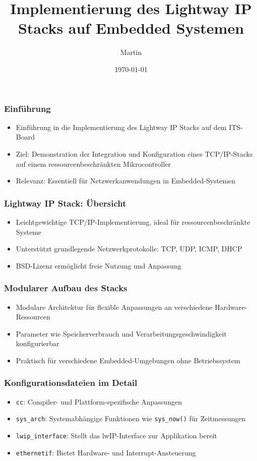 \documentclass{beamer}
\title{Implementierung des Lightway IP Stacks auf Embedded Systemen}
\author{Martin}
\date{\today}
\begin{document}
\frame{\titlepage}

\begin{frame}
\frametitle{Einführung}
\begin{itemize}
    \item Einführung in die Implementierung des Lightway IP Stacks auf dem ITS-Board
    \item Ziel: Demonstration der Integration und Konfiguration eines TCP/IP-Stacks auf einem ressourcenbeschränkten Mikrocontroller
    \item Relevanz: Essentiell für Netzwerkanwendungen in Embedded-Systemen
\end{itemize}
\end{frame}

\begin{frame}
\frametitle{Lightway IP Stack: Übersicht}
\begin{itemize}
    \item Leichtgewichtige TCP/IP-Implementierung, ideal für ressourcenbeschränkte Systeme
    \item Unterstützt grundlegende Netzwerkprotokolle: TCP, UDP, ICMP, DHCP
    \item BSD-Lizenz ermöglicht freie Nutzung und Anpassung
\end{itemize}
\end{frame}

\begin{frame}
\frametitle{Modularer Aufbau des Stacks}
\begin{itemize}
    \item Modulare Architektur für flexible Anpassungen an verschiedene Hardware-Ressourcen
    \item Parameter wie Speicherverbrauch und Verarbeitungsgeschwindigkeit konfigurierbar
    \item Praktisch für verschiedene Embedded-Umgebungen ohne Betriebssystem
\end{itemize}
\end{frame}



\begin{frame}[fragile]
\frametitle{Konfigurationsdateien im Detail}
\begin{itemize}
    \item \texttt{cc}: Compiler- und Plattform-spezifische Anpassungen
    \item \texttt{sys\_arch}: Systemabhängige Funktionen wie \texttt{sys\_now()} für Zeitmessungen
    \item \texttt{lwip\_interface}: Stellt das lwIP-Interface zur Applikation bereit
    \item \texttt{ethernetif}: Bietet Hardware- und Interrupt-Ansteuerung
\end{itemize}
\end{frame}
\end{document}
